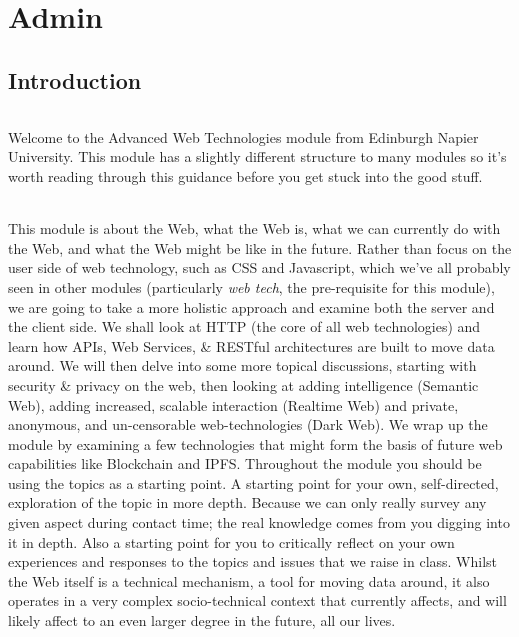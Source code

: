\documentclass[12pt, a4paper, oneside]{book}
\begin{document}
\mainmatter





\part{Admin}

\chapter{Introduction}
\label{intro}

\paragraph{} Welcome to the Advanced Web Technologies module from Edinburgh Napier University. This module has a slightly different structure to many modules so it's worth reading through this guidance before you get stuck into the good stuff.

\paragraph{}This module is about the Web, what the Web is, what we can currently do with the Web, and what the Web might be like in the future. Rather than focus on the user side of web technology, such as CSS and Javascript, which we've all probably seen in other modules (particularly \emph{web tech}, the pre-requisite for this module), we are going to take a more holistic approach and examine both the server and the client side. We shall look at HTTP (the core of all web technologies) and learn how APIs, Web Services, \& RESTful architectures are built to move data around. We will then delve into some more topical discussions, starting with security \& privacy on the web, then looking at adding intelligence (Semantic Web), adding increased, scalable interaction (Realtime Web) and private, anonymous, and un-censorable web-technologies (Dark Web). We wrap up the module by examining a few technologies that might form the basis of future web capabilities like Blockchain and IPFS. Throughout the module you should be using the topics as a starting point. A starting point for your own, self-directed, exploration of the topic in more depth. Because we can only really survey any given aspect during contact time; the real knowledge comes from you digging into it in depth. Also a starting point for you to critically reflect on your own experiences and responses to the topics and issues that we raise in class. Whilst the Web itself is a technical mechanism, a tool for moving data around, it also operates in a very complex socio-technical context that currently affects, and will likely affect to an even larger degree in the future, all our lives.
\end{document}
